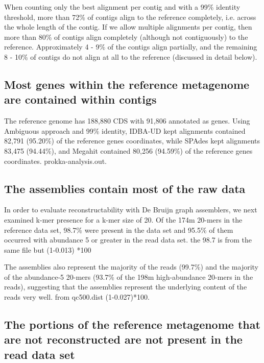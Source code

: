\documentclass[10pt,a4paper,twocolumn]{article}
\begin{document}
When counting only the best alignment per contig and with a 99\%
identity threshold, more than 72\% of contigs align to the reference
completely, i.e. across the whole length of the contig.  If we allow
multiple alignments per contig, then more than 80\% of contigs align
completely (although not contiguously) to the reference.
Approximately 4 - 9\% of the contigs align partially, and the
remaining 8 - 10\% of contigs do not align at all to the reference
(discussed in detail below).


\subsection*{Most genes within the reference metagenome are contained within contigs}

The reference genome has 188,880 CDS with 91,806 annotated as genes.
Using Ambiguous approach and 99\% identity, IDBA-UD kept alignments
contained 82,791 (95.20\%) of the reference genes coordinates, while
SPAdes kept alignments 83,475 (94.44\%), and Megahit contained 80,256
(94.59\%) of the reference genes coordinates. %
prokka-analysis.out.

\subsection*{The assemblies contain most of the raw data}

In order to evaluate reconstructability with De Bruijn graph
assemblers, we next examined k-mer presence for a k-mer size of 20. Of
the 174m 20-mers in the reference data set, 98.7\% were present in the
data set and 95.5\% of them occurred with abundance 5 or greater in
the read data set. %
the 98.7 is from the same file but (1-0.013) *100

The assemblies also represent the majority of the reads (99.7\%) and
the majority of the abundance-5 20-mers (93.7\% of the 198m
high-abundance 20-mers in the reads), suggesting that the assemblies
represent the underlying content of the reads very well. %
from qc500.dist (1-0.027)*100.

\subsection*{The portions of the reference metagenome that are not reconstructed are not present in the read data set}
 
\end{document}
